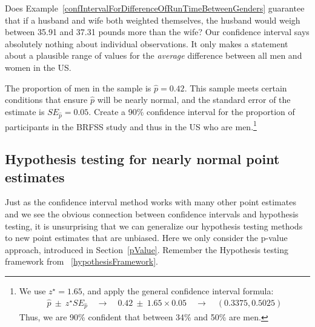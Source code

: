 \begin{example}{Does Example~\ref{confIntervalForDifferenceOfRunTimeBetweenGenders} guarantee that if a husband and wife both weighted themselves, the husband would weigh between 35.91 and 37.31 pounds more than the wife?}
Our confidence interval says absolutely nothing about individual observations. It {only} makes a statement about a plausible range of values for the \emph{average} difference between all men and women in the US. 
\end{example}

\begin{exercise}
The proportion of men in the  sample is $\hat{p}=0.42$. This sample meets certain conditions that ensure $\hat{p}$ will be nearly normal, and the standard error of the estimate is $SE_{\hat{p}}=0.05$. Create a 90\% confidence interval for the proportion of participants in the BRFSS study and thus in the US who are men.\footnote{We use $z^{\star}=1.65$, and apply the general confidence interval formula:
\begin{eqnarray*}
\hat{p}\ \pm\ z^{\star}SE_{\hat{p}}
	\quad\to\quad 0.42\ \pm\ 1.65\times 0.05
	\quad\to\quad (0.3375, 0.5025)
\end{eqnarray*}
Thus, we are 90\% confident that between 34\% and 50\% are men.}
\end{exercise}


\subsection{Hypothesis testing for nearly normal point estimates}

Just as the confidence interval method works with many other point estimates and we see the obvious connection between confidence intervals and hypothesis testing, it is unsurprising that we can generalize our hypothesis testing methods to new point estimates that are unbiased. Here we only consider the p-value approach, introduced in Section~\ref{pValue}. Remember the Hypothesis testing framework from ~\ref{hypothesisFramework}. 

